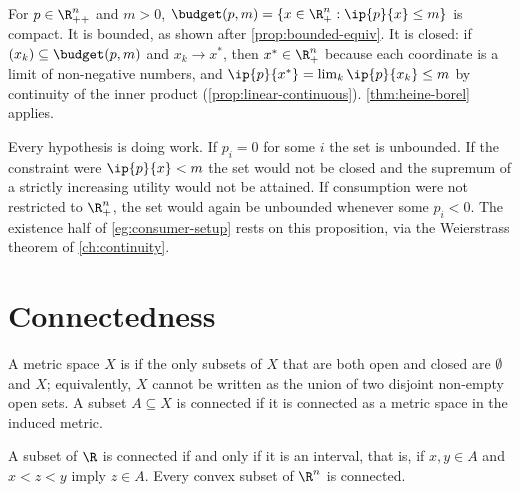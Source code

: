\begin{eg}\label{eg:budget-compact}
	For $p\in\R^n_{++}$ and $m>0$,
	$\budget(p,m)=\{x\in\R^n_+:\ip{p}{x}\leq m\}$ is compact. It is bounded, as
	shown after \autoref{prop:bounded-equiv}. It is closed: if
	$(x_k)\subseteq\budget(p,m)$ and $x_k\to x^\ast$, then
	$x^\ast\in\R^n_+$ because each coordinate is a limit of non-negative numbers,
	and $\ip{p}{x^\ast}=\lim_k\ip{p}{x_k}\leq m$ by continuity of the inner product
	(\autoref{prop:linear-continuous}). \autoref{thm:heine-borel} applies.

	Every hypothesis is doing work. If $p_i=0$ for some $i$ the set is unbounded. If
	the constraint were $\ip{p}{x}<m$ the set would not be closed and the supremum
	of a strictly increasing utility would not be attained. If consumption were not
	restricted to $\R^n_+$, the set would again be unbounded whenever some $p_i<0$.
	The existence half of \autoref{eg:consumer-setup} rests on this
	proposition, via the Weierstrass theorem of \autoref{ch:continuity}.
\end{eg}

\section{Connectedness}\label{sec:top-connected}

\begin{definition}\label{def:connected}
	A metric space $X$ is  if the only subsets of $X$ that are both
	open and closed are $\emptyset$ and $X$; equivalently, $X$ cannot be written as
	the union of two disjoint non-empty open sets. A subset $A\subseteq X$ is
	connected if it is connected as a metric space in the induced metric.
\end{definition}

\begin{proposition}\label{prop:connected-interval}
	A subset of $\R$ is connected if and only if it is an interval, that is, if
	$x,y\in A$ and $x<z<y$ imply $z\in A$. Every convex subset of $\R^n$ is
	connected.
\end{proposition}

